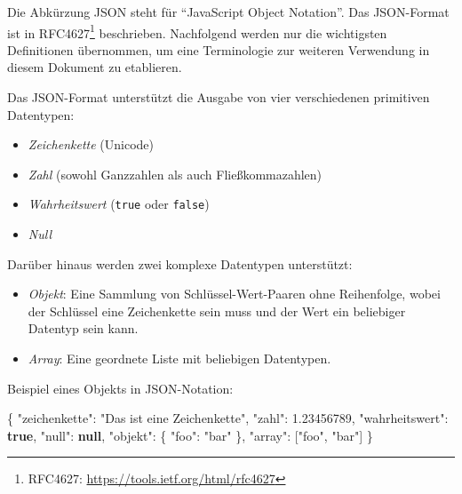 \documentclass[,a4paper]{article}
\newenvironment{Shaded}{}{}
\newcommand{\KeywordTok}[1]{\textcolor[rgb]{0.00,0.44,0.13}{\textbf{{#1}}}}
\newcommand{\DataTypeTok}[1]{\textcolor[rgb]{0.56,0.13,0.00}{{#1}}}
\newcommand{\FloatTok}[1]{\textcolor[rgb]{0.25,0.63,0.44}{{#1}}}
\newcommand{\StringTok}[1]{\textcolor[rgb]{0.25,0.44,0.63}{{#1}}}
\newcommand{\OtherTok}[1]{\textcolor[rgb]{0.00,0.44,0.13}{{#1}}}
\newcommand{\FunctionTok}[1]{\textcolor[rgb]{0.02,0.16,0.49}{{#1}}}
\begin{document}
Die Abkürzung JSON steht für ``JavaScript Object Notation''. Das
JSON-Format ist in RFC4627\footnote{RFC4627:
  \url{https://tools.ietf.org/html/rfc4627}} beschrieben. Nachfolgend
werden nur die wichtigsten Definitionen übernommen, um eine Terminologie
zur weiteren Verwendung in diesem Dokument zu etablieren.

Das JSON-Format unterstützt die Ausgabe von vier verschiedenen
primitiven Datentypen:

\begin{itemize}
\itemsep1pt\parskip0pt
\item
  \emph{Zeichenkette} (Unicode)
\item
  \emph{Zahl} (sowohl Ganzzahlen als auch Fließkommazahlen)
\item
  \emph{Wahrheitswert} (\texttt{true} oder \texttt{false})
\item
  \emph{Null}
\end{itemize}

Darüber hinaus werden zwei komplexe Datentypen unterstützt:

\begin{itemize}
\itemsep1pt\parskip0pt
\item
  \emph{Objekt}: Eine Sammlung von Schlüssel-Wert-Paaren ohne
  Reihenfolge, wobei der Schlüssel eine Zeichenkette sein muss und der
  Wert ein beliebiger Datentyp sein kann.
\item
  \emph{Array}: Eine geordnete Liste mit beliebigen Datentypen.
\end{itemize}

Beispiel eines Objekts in JSON-Notation:

\begin{Shaded}
\begin{Highlighting}[]
\FunctionTok{\{}
    \DataTypeTok{"zeichenkette"}\FunctionTok{:} \StringTok{"Das ist eine Zeichenkette"}\FunctionTok{,}
    \DataTypeTok{"zahl"}\FunctionTok{:} \FloatTok{1.23456789}\FunctionTok{,}
    \DataTypeTok{"wahrheitswert"}\FunctionTok{:} \KeywordTok{true}\FunctionTok{,}
    \DataTypeTok{"null"}\FunctionTok{:} \KeywordTok{null}\FunctionTok{,}
    \DataTypeTok{"objekt"}\FunctionTok{:} \FunctionTok{\{}
        \DataTypeTok{"foo"}\FunctionTok{:} \StringTok{"bar"}
    \FunctionTok{\},}
    \DataTypeTok{"array"}\FunctionTok{:} \OtherTok{[}\StringTok{"foo"}\OtherTok{,} \StringTok{"bar"}\OtherTok{]}
\FunctionTok{\}}
\end{Highlighting}
\end{Shaded}
\end{document}
